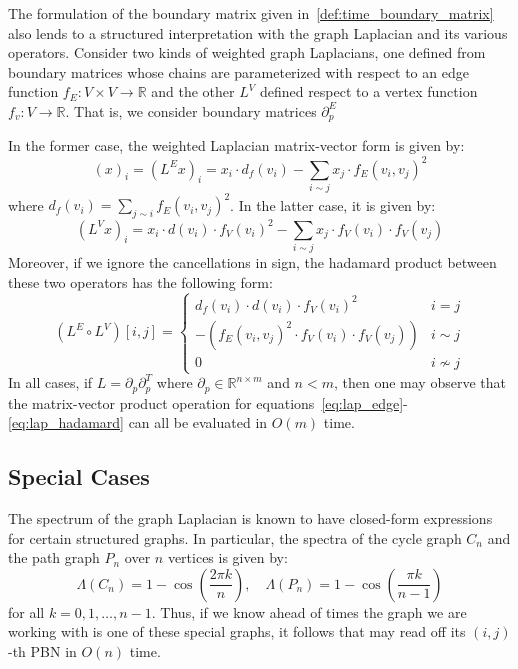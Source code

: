 \documentclass[10pt]{article}
\newcommand{\+}{%
	\raisebox{0.18ex}{\scaleobj{0.55}{+}}
}
\theoremstyle{definition}
\begin{document}

The formulation of the boundary matrix given in~\eqref{def:time_boundary_matrix} also lends to a structured interpretation with the graph Laplacian and its various operators. Consider two kinds of weighted graph Laplacians, one defined from boundary matrices whose chains are parameterized with respect to an edge function $f_E : V \times V \to \mathbb{R}$ and the other $L^V$ defined respect to a vertex function $f_v : V \to \mathbb{R}$. 
That is, we consider boundary matrices $\partial_p^E$

In the former case, the weighted Laplacian matrix-vector form is given by: 
\begin{equation}\label{eq:lap_edge}
	\left ( x \right )_i = (L^E x)_i =  x_i \cdot d_f(v_i) -  \sum\limits_{i \sim j} x_j \cdot f_E(v_i, v_j)^2
\end{equation}
where $d_f(v_i) = \sum\limits_{j \sim i} f_E(v_i, v_j)^2$. In the latter case, it is given by: 
\begin{equation}\label{eq:lap_vertex}
	(L^V x)_i =  x_i \cdot d(v_i) \cdot f_V(v_i)^2 -  \sum\limits_{i \sim j} x_j \cdot f_V(v_i) \cdot  f_V(v_j)
\end{equation}
Moreover, if we ignore the cancellations in sign, the hadamard product between these two operators has the following form: 
\begin{equation}\label{eq:lap_hadamard}
	(L^E \circ L^V)[i,j] = 
	\begin{cases}
		d_f(v_i) \cdot d(v_i) \cdot f_V(v_i)^2	& i = j \\
		-(f_E(v_i, v_j)^2 \cdot f_V(v_i) \cdot f_V(v_j)) & i \sim j \\
		0 & i \nsim j 	
	\end{cases}
\end{equation}
In all cases, if $L = \partial_p \partial_p^T$ where $\partial_p \in \mathbb{R}^{n \times m}$ and $n < m$, then one may observe that the matrix-vector product operation for equations~\eqref{eq:lap_edge}-\eqref{eq:lap_hadamard} can all be evaluated in $O(m)$ time. 

\subsection{Special Cases} The spectrum of the graph Laplacian is known to have closed-form expressions for certain structured graphs. In particular, the spectra of the cycle graph $C_n$ and the path graph $P_n$ over $n$ vertices is given by: 
\begin{equation}
	\Lambda(C_n) = 1-\cos\left (\frac{2\pi k}{n} \right), \quad \Lambda(P_n) = 1-\cos\left (\frac{\pi k}{n-1} \right)
\end{equation}
for all $k = 0, 1, \dots, n-1$. Thus, if we know ahead of times the graph we are working with is one of these special graphs, it follows that may read off its $(i,j)$-th PBN in $O(n)$ time. 
\end{document}
